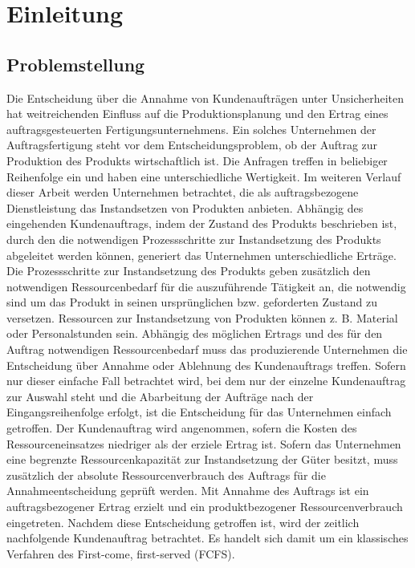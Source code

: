 \chapter{Einleitung}

\section{Problemstellung}

Die Entscheidung über die Annahme von Kundenaufträgen unter Unsicherheiten hat weitreichenden Einfluss auf die Produktionsplanung und den Ertrag eines auftragsgesteuerten Fertigungsunternehmens. Ein solches Unternehmen der Auftragsfertigung steht vor dem Entscheidungsproblem, ob der Auftrag zur Produktion des Produkts wirtschaftlich ist. Die Anfragen treffen in beliebiger Reihenfolge ein und haben eine unterschiedliche Wertigkeit. Im weiteren Verlauf dieser Arbeit werden Unternehmen betrachtet, die als auftragsbezogene Dienstleistung das Instandsetzen von Produkten anbieten. Abhängig des eingehenden Kundenauftrags, indem der Zustand des Produkts beschrieben ist, durch den die notwendigen Prozessschritte zur Instandsetzung des Produkts abgeleitet werden können, generiert das Unternehmen unterschiedliche Erträge. Die Prozessschritte zur Instandsetzung des Produkts geben zusätzlich den notwendigen Ressourcenbedarf für die auszuführende Tätigkeit an, die notwendig sind um das Produkt in seinen ursprünglichen bzw. geforderten Zustand zu versetzen. Ressourcen zur Instandsetzung von Produkten können z. B. Material oder Personalstunden sein. Abhängig des möglichen Ertrags und des für den Auftrag notwendigen Ressourcenbedarf muss das produzierende Unternehmen die Entscheidung über Annahme oder Ablehnung des Kundenauftrags treffen. Sofern nur dieser einfache Fall betrachtet wird, bei dem nur der einzelne Kundenauftrag zur Auswahl steht und die Abarbeitung der Aufträge nach der Eingangsreihenfolge erfolgt, ist die Entscheidung für das Unternehmen einfach getroffen. Der Kundenauftrag wird angenommen, sofern die Kosten des Ressourceneinsatzes niedriger als der erziele Ertrag ist.
Sofern das Unternehmen eine begrenzte Ressourcenkapazität zur Instandsetzung der Güter besitzt, muss zusätzlich der absolute Ressourcenverbrauch des Auftrags für die Annahmeentscheidung geprüft werden. Mit Annahme des Auftrags ist ein auftragsbezogener Ertrag erzielt und ein produktbezogener Ressourcenverbrauch eingetreten. Nachdem diese Entscheidung getroffen ist, wird der zeitlich nachfolgende Kundenauftrag betrachtet. Es handelt sich damit um ein klassisches Verfahren des \glqq First-come, first-served (FCFS){\grqq}.

